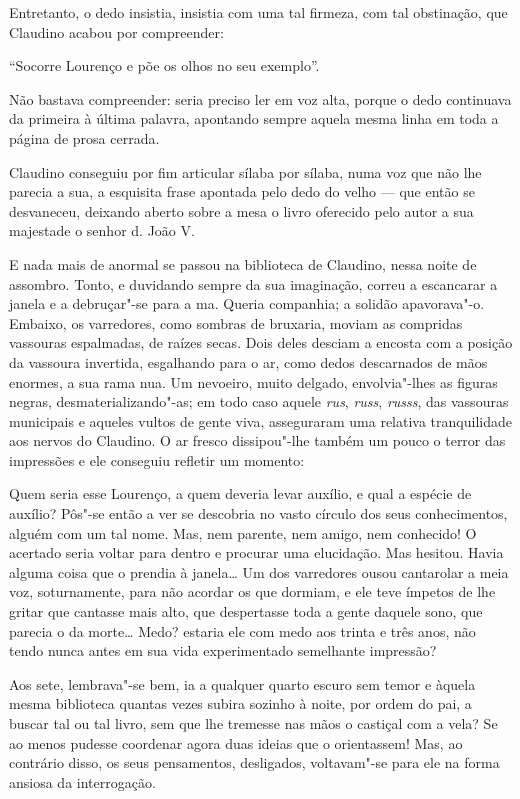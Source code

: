Entretanto, o dedo insistia, insistia com uma tal firmeza, com tal
obstinação, que Claudino acabou por compreender:

``Socorre Lourenço e põe os olhos no seu exemplo''.

Não bastava compreender: seria preciso ler em voz alta, porque o dedo
continuava da primeira à última palavra, apontando sempre aquela mesma
linha em toda a página de prosa cerrada.

Claudino conseguiu por fim articular sílaba por sílaba, numa voz que não
lhe parecia a sua, a esquisita frase apontada pelo dedo do velho --- que
então se desvaneceu, deixando aberto sobre a mesa o livro oferecido pelo
autor a sua majestade o senhor d. João V.

E nada mais de anormal se passou na biblioteca de Claudino, nessa noite
de assombro. Tonto, e duvidando sempre da sua imaginação, correu a
escancarar a janela e a debruçar"-se para a ma. Queria companhia; a
solidão apavorava"-o. Embaixo, os varredores, como sombras de bruxaria,
moviam as compridas vassouras espalmadas, de raízes secas. Dois deles
desciam a encosta com a posição da vassoura invertida, esgalhando para o
ar, como dedos descarnados de mãos enormes, a sua rama nua. Um nevoeiro,
muito delgado, envolvia"-lhes as figuras negras, desmaterializando"-as; em
todo caso aquele \emph{rus}, \emph{russ}, \emph{russs}, das vassouras
municipais e aqueles vultos de gente viva, asseguraram uma relativa
tranquilidade aos nervos do Claudino. O ar fresco dissipou"-lhe
também um pouco o terror das impressões e ele conseguiu refletir um
momento:

Quem seria esse Lourenço, a quem deveria levar auxílio, e qual a espécie
de auxílio? Pôs"-se então a ver se descobria no vasto círculo dos seus
conhecimentos, alguém com um tal nome. Mas, nem parente, nem amigo, nem
conhecido! O acertado seria voltar para dentro e procurar uma
elucidação. Mas hesitou. Havia alguma coisa que o prendia à janela\ldots{} Um
dos varredores ousou cantarolar a meia voz, soturnamente, para não
acordar os que dormiam, e ele teve ímpetos de lhe gritar que cantasse
mais alto, que despertasse toda a gente daquele sono, que parecia o da
morte\ldots{} Medo? estaria ele com medo aos trinta e três anos, não tendo
nunca antes em sua vida experimentado semelhante impressão?

Aos sete, lembrava"-se bem, ia a qualquer quarto escuro sem temor e
àquela mesma biblioteca quantas vezes subira sozinho à noite, por ordem
do pai, a buscar tal ou tal livro, sem que lhe tremesse nas mãos o
castiçal com a vela? Se ao menos pudesse coordenar agora duas ideias que
o orientassem! Mas, ao contrário disso, os seus pensamentos, desligados,
voltavam"-se para ele na forma ansiosa da interrogação.

